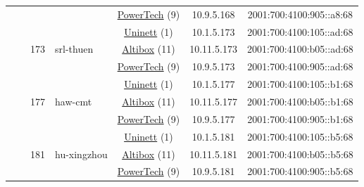 \begin{small}
\begin{center}
\begin{longtable}{|c|c|c|c|c|c|c|c|}
  &  &  &  & \multicolumn{2}{|c|}{\tiny{\href{http://www.powertech.no}{PowerTech} (9)}} & \tiny{10.9.5.168} & \tiny{2001:700:4100:905::a8:68} \\* \cline{3-3}\cline{4-4}\cline{5-5}\cline{6-6}\cline{7-7}\cline{8-8}
  &  & \multirow{3}{*}{\tiny{173}} & \multicolumn{1}{|l|}{\multirow{3}{*}{\tiny{srl-thuen}}} & \multicolumn{2}{|c|}{\tiny{\href{https://www.uninett.no}{Uninett} (1)}} & \tiny{10.1.5.173} & \tiny{2001:700:4100:105::ad:68} \\* \cline{5-5}\cline{6-6}\cline{7-7}\cline{8-8}
  &  &  &  & \multicolumn{2}{|c|}{\tiny{\href{https://www.altibox.no}{Altibox} (11)}} & \tiny{10.11.5.173} & \tiny{2001:700:4100:b05::ad:68} \\* \cline{5-5}\cline{6-6}\cline{7-7}\cline{8-8}
  &  &  &  & \multicolumn{2}{|c|}{\tiny{\href{http://www.powertech.no}{PowerTech} (9)}} & \tiny{10.9.5.173} & \tiny{2001:700:4100:905::ad:68} \\* \cline{3-3}\cline{4-4}\cline{5-5}\cline{6-6}\cline{7-7}\cline{8-8}
  &  & \multirow{3}{*}{\tiny{177}} & \multicolumn{1}{|l|}{\multirow{3}{*}{\tiny{haw-cmt}}} & \multicolumn{2}{|c|}{\tiny{\href{https://www.uninett.no}{Uninett} (1)}} & \tiny{10.1.5.177} & \tiny{2001:700:4100:105::b1:68} \\* \cline{5-5}\cline{6-6}\cline{7-7}\cline{8-8}
  &  &  &  & \multicolumn{2}{|c|}{\tiny{\href{https://www.altibox.no}{Altibox} (11)}} & \tiny{10.11.5.177} & \tiny{2001:700:4100:b05::b1:68} \\* \cline{5-5}\cline{6-6}\cline{7-7}\cline{8-8}
  &  &  &  & \multicolumn{2}{|c|}{\tiny{\href{http://www.powertech.no}{PowerTech} (9)}} & \tiny{10.9.5.177} & \tiny{2001:700:4100:905::b1:68} \\* \cline{3-3}\cline{4-4}\cline{5-5}\cline{6-6}\cline{7-7}\cline{8-8}
  &  & \multirow{3}{*}{\tiny{181}} & \multicolumn{1}{|l|}{\multirow{3}{*}{\tiny{hu-xingzhou}}} & \multicolumn{2}{|c|}{\tiny{\href{https://www.uninett.no}{Uninett} (1)}} & \tiny{10.1.5.181} & \tiny{2001:700:4100:105::b5:68} \\* \cline{5-5}\cline{6-6}\cline{7-7}\cline{8-8}
  &  &  &  & \multicolumn{2}{|c|}{\tiny{\href{https://www.altibox.no}{Altibox} (11)}} & \tiny{10.11.5.181} & \tiny{2001:700:4100:b05::b5:68} \\* \cline{5-5}\cline{6-6}\cline{7-7}\cline{8-8}
  &  &  &  & \multicolumn{2}{|c|}{\tiny{\href{http://www.powertech.no}{PowerTech} (9)}} & \tiny{10.9.5.181} & \tiny{2001:700:4100:905::b5:68} \\* \cline{3-3}\cline{4-4}\cline{5-5}\cline{6-6}\cline{7-7}\cline{8-8}

\end{longtable}
\end{center}
\end{small}
